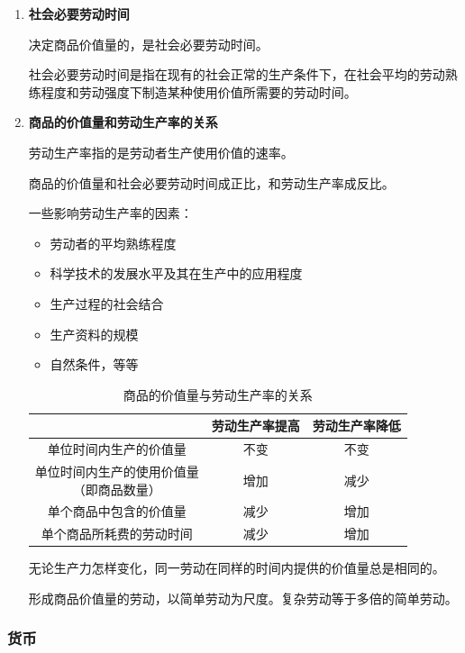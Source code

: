\documentclass[12pt, a4paper, oneside]{ctexart}
\begin{document}
\begin{enumerate}
  \item {\bf 社会必要劳动时间}
  
  决定商品价值量的，是社会必要劳动时间。

  社会必要劳动时间是指在现有的社会正常的生产条件下，在社会平均的劳动熟练程度和劳动强度下制造某种使用价值所需要的劳动时间。

  \item {\bf 商品的价值量和劳动生产率的关系}
  
  劳动生产率指的是劳动者生产使用价值的速率。

  商品的价值量和社会必要劳动时间成正比，和劳动生产率成反比。

  一些影响劳动生产率的因素：
  \begin{itemize}
    \item 劳动者的平均熟练程度
    \item 科学技术的发展水平及其在生产中的应用程度
    \item 生产过程的社会结合
    \item 生产资料的规模
    \item 自然条件，等等
  \end{itemize}

  \begin{table}[h]
    \centering
    \caption{商品的价值量与劳动生产率的关系}
    \begin{tabular}{|c|c|c|}
      \hline
      & 劳动生产率提高 & 劳动生产率降低 \\ \hline
      单位时间内生产的价值量 & 不变 & 不变 \\ \hline
      \makecell[c]{单位时间内生产的使用价值量\\ （即商品数量）} & 增加 & 减少 \\ \hline
      单个商品中包含的价值量 & 减少 & 增加\\ \hline
      单个商品所耗费的劳动时间 & 减少 & 增加 \\
      \hline
    \end{tabular}
  \end{table}

  无论生产力怎样变化，同一劳动在同样的时间内提供的价值量总是相同的。

  形成商品价值量的劳动，以简单劳动为尺度。复杂劳动等于多倍的简单劳动。
\end{enumerate}

\subsubsection{货币}
\end{document}
